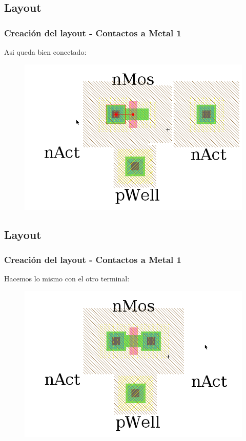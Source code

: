 \documentclass{beamer}
\begin{document}
\begin{frame}
\subsection{Layout}
\frametitle{Creación del layout - Contactos a Metal 1}
Asi queda bien conectado:
\begin{figure}
  \includegraphics[width=0.89\linewidth]{figuras/edicionElectric-8bbb.png}
\end{figure}
\end{frame}
\begin{frame}
\subsection{Layout}
\frametitle{Creación del layout - Contactos a Metal 1}
Hacemos lo mismo con el otro terminal:
\begin{figure}
  \includegraphics[width=0.89\linewidth]{figuras/edicionElectric-8bbbb.png}
\end{figure}
\end{frame}
\end{document}
